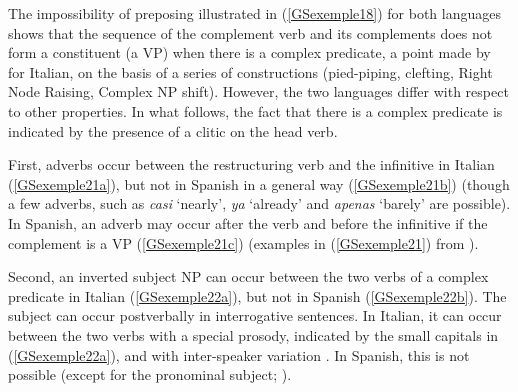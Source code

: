 {The impossibility of preposing illustrated in (\ref{GSexemple18}) for both languages shows that the sequence of the complement verb and its complements does not form a constituent (a VP) when there is a complex predicate, a point made by \cite{rizzi1982issues} for Italian, on the basis of a series of constructions (pied-piping, clefting, Right Node Raising, Complex NP shift). However, the two languages differ with respect to other properties. In what follows, the fact that there is a complex predicate is indicated by the presence of a clitic on the head verb.
 
First, adverbs occur between the restructuring verb and the infinitive in Italian (\ref{GSexemple21a}), but not in Spanish in a general way (\ref{GSexemple21b}) (though a few adverbs, such as \emph{casi} `nearly', \emph{ya} `already' and \emph{apenas} `barely' are possible). In Spanish, an adverb may occur after the verb and before the infinitive if the complement is a VP (\ref{GSexemple21c}) (examples in (\ref{GSexemple21}) from \citealt[139]{AG2010}).

\eal
	\label{GSexemple21} 
	\label{GSexemple21a}

	\label{GSexemple21b}		
	
	\label{GSexemple21c}	
\zl

Second, an inverted subject NP can occur between the two verbs of a complex predicate in Italian (\ref{GSexemple22a}), but not in Spanish (\ref{GSexemple22b}). The subject can occur postverbally in interrogative sentences. In Italian, it can occur between the two verbs with a special prosody, indicated by the small capitals in (\ref{GSexemple22a}), and with inter-speaker variation \citep{salvi1980ausiliari}. In Spanish, this is not possible (except for the pronominal subject; \citealt{suner1982syntax}).

\eal
\judgewidth{\%}
	\label{GSexemple22} 
	\label{GSexemple22a}

}
